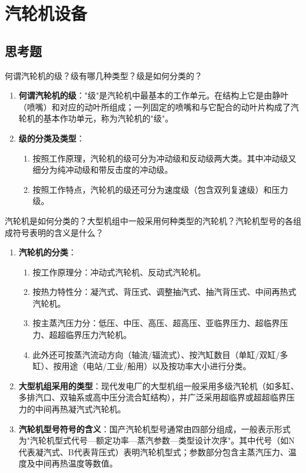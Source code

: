 \chapter{汽轮机设备}

\section{思考题}

\begin{problem}
何谓汽轮机的级？级有哪几种类型？级是如何分类的？
\end{problem}

\begin{solution}
\begin{enumerate}
  \item \textbf{何谓汽轮机的级}："级"是汽轮机中最基本的工作单元。在结构上它是由静叶（喷嘴）和对应的动叶所组成；一列固定的喷嘴和与它配合的动叶片构成了汽轮机的基本作功单元，称为汽轮机的"级"。
  \item \textbf{级的分类及类型}：
  \begin{enumerate}
    \item 按照工作原理，汽轮机的级可分为冲动级和反动级两大类。其中冲动级又细分为纯冲动级和带反击度的冲动级。
    \item 按照工作特点，汽轮机的级还可分为速度级（包含双列复速级）和压力级。
  \end{enumerate}
\end{enumerate}
\end{solution}

\begin{problem}
汽轮机是如何分类的？大型机组中一般采用何种类型的汽轮机？汽轮机型号的各组成符号表明的含义是什么？
\end{problem}

\begin{solution}
\begin{enumerate}
  \item \textbf{汽轮机的分类}：
  \begin{enumerate}
    \item 按工作原理分：冲动式汽轮机、反动式汽轮机。
    \item 按热力特性分：凝汽式、背压式、调整抽汽式、抽汽背压式、中间再热式汽轮机。
    \item 按主蒸汽压力分：低压、中压、高压、超高压、亚临界压力、超临界压力、超超临界压力汽轮机。
    \item 此外还可按蒸汽流动方向（轴流/辐流式）、按汽缸数目（单缸/双缸/多缸）、按用途（电站/工业/船用）以及按功率大小进行分类。
  \end{enumerate}
  \item \textbf{大型机组采用的类型}：现代发电厂的大型机组一般采用多级汽轮机（如多缸、多排汽口、双轴系或高中压分流合缸结构），并广泛采用超临界或超超临界压力的中间再热凝汽式汽轮机。
  \item \textbf{汽轮机型号符号的含义}：国产汽轮机型号通常由四部分组成，一般表示形式为"汽轮机型式代号—额定功率—蒸汽参数—类型设计次序"。其中代号（如N代表凝汽式、B代表背压式）表明汽轮机型式；参数部分包含主蒸汽压力、温度及中间再热温度等数值。
\end{enumerate}
\end{solution}

